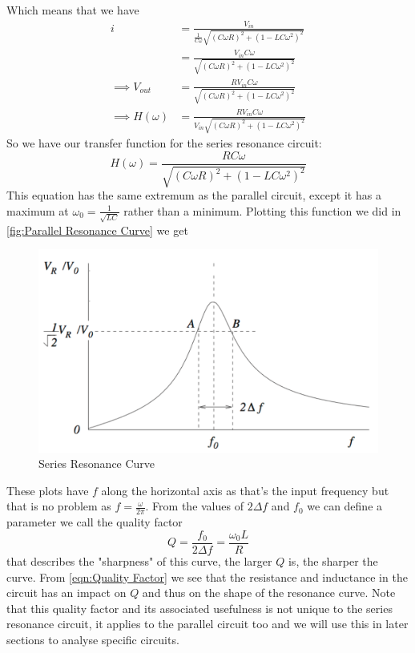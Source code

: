 \documentclass[12pt]{article}
\numberwithin{equation}{section}
\numberwithin{figure}{section}
\begin{document}
    Which means that we have 
    \begin{align*}
        i&=\frac{V_{in}}{\frac{1}{C\omega}\sqrt{(C\omega R)^2+(1-LC\omega^2)^2}}\\
        &=\frac{V_{in}C\omega}{\sqrt{(C\omega R)^2+(1-LC\omega^2)^2}}\\
        \implies V_{out}&=\frac{RV_{in}C\omega}{\sqrt{(C\omega R)^2+(1-LC\omega^2)^2}}\\
        \implies H(\omega)&=\frac{RV_{in}C\omega}{V_{in}\sqrt{(C\omega R)^2+(1-LC\omega^2)^2}}
    \end{align*}
    So we have our transfer function for the series resonance circuit:
    \begin{equation}
        H(\omega)=\frac{RC\omega}{\sqrt{(C\omega R)^2+(1-LC\omega^2)^2}}
        \label{eqn:Series Transfer Function}
    \end{equation}
    This equation has the same extremum as the parallel circuit, except it has a maximum at 
    $\omega_0=\frac{1}{\sqrt{LC}}$ rather than a minimum. Plotting this function we did in 
    \autoref{fig:Parallel Resonance Curve} we get 
    \begin{figure}[H]
        \begin{center}
           \includegraphics[width=.65\textwidth]{SeriesResonanceCurve.png}
           \caption{Series Resonance Curve}
           \label{fig:Series Resonance Curve}
        \end{center}
    \end{figure}
    These plots have $f$ along the horizontal axis as that's the input frequency but that is no problem 
    as $f=\frac{\omega}{2\pi}$. From the values of $2\Delta f$ and $f_0$ we can define a parameter 
    we call the quality factor 
    \begin{equation}
        Q=\frac{f_0}{2\Delta f}=\frac{\omega_0L}{R}
        \label{eqn:Quality Factor}
    \end{equation}
    that describes the "sharpness" of this curve, the larger $Q$ is, the sharper the curve. From 
    \autoref{eqn:Quality Factor} we see that the resistance and inductance in the circuit has an 
    impact on $Q$ and thus on the shape of the resonance curve. Note that this quality factor and its 
    associated usefulness is not unique to the series resonance circuit, it applies to the parallel 
    circuit too and we will use this in later sections to analyse specific circuits.
\end{document}
